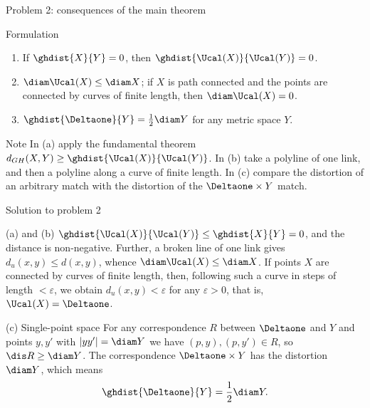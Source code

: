\documentclass[aspectratio=169,11pt]{beamer}
\begin{document}
\begin{frame}{Problem \textup{2}: consequences of the main theorem}
\begin{block}{Formulation}
\begin{enumerate}
\item[(a)] If $\ghdist{X}{Y} = 0$, then $\ghdist{\Ucal(X)}{\Ucal(Y)} = 0$.
\item[(b)] $\diam\Ucal(X) \le \diam X$\textup{;} if $X$ is path connected and the points are connected by curves of finite length, then $\diam\Ucal(X) = 0$.
\item[(c)] $\ghdist{\Deltaone}{Y} = \frac12 \diam Y$ for any metric space $Y$.
\end{enumerate}
\end{block}
\begin{block}{Note}
In \textup{(a)} apply the fundamental theorem $d_{GH}(X,Y) \ge \ghdist{\Ucal(X)}{\Ucal(Y)}$. In \textup{(b)} take a polyline of one link, and then a polyline along a curve of finite length. In \textup{(c)} compare the distortion of an arbitrary match with the distortion of the $\Deltaone \times Y$ match.
\end{block}
\end{frame}

\begin{frame}{Solution to problem \textup{2}}
\begin{block}{\textup{(a)} and \textup{(b)}}
$\ghdist{\Ucal(X)}{\Ucal(Y)} \le \ghdist{X}{Y} = 0$, and the distance is non-negative. Further, a broken line of one link gives $d_u(x,y) \le d(x,y)$, whence $\diam\Ucal(X) \le \diam X$. If points $X$ are connected by curves of finite length, then, following such a curve in steps of length $< \varepsilon$, we obtain $d_u(x,y) < \varepsilon$ for any $\varepsilon > 0$, that is, $\Ucal(X) = \Deltaone$.
\end{block}
\begin{block}{\textup{(c)} Single-point space}
For any correspondence $R$ between $\Deltaone$ and $Y$ and points $y,y'$ with $|yy'| = \diam Y$ we have $(p,y), (p,y') \in R$, so $\dis R \ge \diam Y$. The correspondence $\Deltaone \times Y$ has the distortion $\diam Y$, which means
\[
\ghdist{\Deltaone}{Y} = \frac12 \diam Y .
\]
\end{block}
\end{frame}
\end{document}
